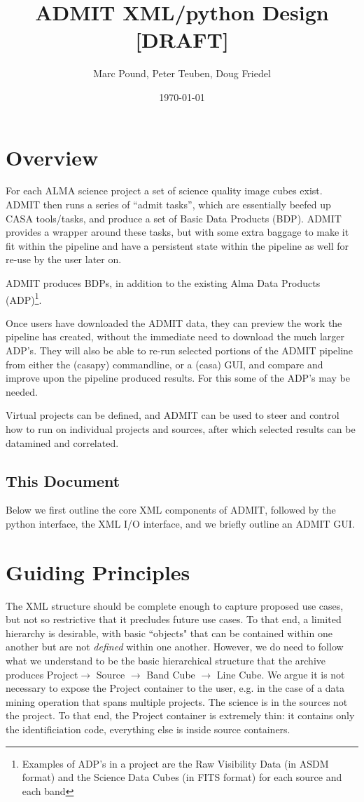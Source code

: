\documentclass{article}
\title{ADMIT XML/python Design [DRAFT]}
\author{Marc Pound, Peter Teuben, Doug Friedel}
\date{\today}
\begin{document}
\maketitle

\section{Overview}

For each ALMA science project a set of science quality image cubes
exist. ADMIT then runs a series of ``admit tasks'', which are
essentially beefed up CASA tools/tasks, and produce a set of Basic
Data Products (BDP).  ADMIT provides a wrapper around these tasks, but
with some extra baggage to make it fit within the pipeline and have a
persistent state within the pipeline as well for re-use by the user
later on.

ADMIT produces BDPs, in addition to the existing
Alma Data Products (ADP)\footnote{Examples of ADP's in a project are
the Raw Visibility Data (in ASDM format) and the Science Data Cubes
(in FITS format) for each source and each band}.

Once users have downloaded the ADMIT data, they can preview the work
the pipeline has created, without the immediate need to download the
much larger ADP's. They will also be able to re-run selected portions
of the ADMIT pipeline from either the (casapy) commandline, or a
(casa) GUI, and compare and improve upon the pipeline produced
results. For this some of the ADP's may be needed.

Virtual projects can be defined, and ADMIT can be used to steer and control
how to run on individual projects and sources, after which selected
results can be datamined and correlated.

\subsection{This Document}

Below we first outline the core XML components of ADMIT, followed by
the python interface, the XML I/O interface, and we briefly outline an
ADMIT GUI.

\section{Guiding Principles}

The XML structure should be complete enough to capture proposed use cases,
but not so restrictive that it precludes future use cases. To that end, a
limited hierarchy is desirable, with basic ``objects" that can be contained
within one another but are not {\it defined} within one another.  However, we
do need to follow what we understand to be the basic hierarchical structure
that the archive produces 
Project$\rightarrow$ Source $\rightarrow$ Band Cube $\rightarrow$ Line Cube.
We argue it is not necessary to expose the Project container to
the user, e.g. in the case of a data mining operation that spans multiple
projects. The science is in the sources not the project. To that end, the
Project container is extremely thin: it contains only the identificiation
code, everything else is inside source containers.
\end{document}
